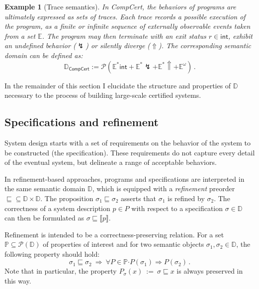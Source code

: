 \documentclass[11pt,oneside]{book}
\newtheorem{example}[theorem]{Example}
\theoremstyle{definition}
\newcommand{\kw}[1]{\ensuremath{ \mathsf{#1} }}
\newcommand{\bdot}{\boldsymbol{\cdot}}
\newcommand{\refby}{\sqsubseteq} %
\begin{document}
\begin{example}[Trace semantics] \label{ex:trsem} %
In CompCert,
the behaviors of programs are ultimately expressed
as sets of traces.
Each trace records a possible execution of the program,
as a finite or infinite sequence of externally observable events
taken from a set $\mathbb{E}$.
The program may then
terminate with an exit status $r \in \kw{int}$,
exhibit an undefined behavior ($\lightning$)
or silently diverge ($\Uparrow$).
The corresponding semantic domain can be defined as:
\[
  \mathbb{D}_\kw{CompCert} :=
    \mathcal{P}
      (\mathbb{E}^*\kw{int} +
       \mathbb{E}^*{\lightning} +
       \mathbb{E}^*{\Uparrow} +
       \mathbb{E}^\omega)
  \,.
\]
\end{example}

In the remainder of this section I elucidate
the structure and properties of $\mathbb{D}$
necessary to the process of building
large-scale certified systems.


\subsection{Specifications and refinement} %

System design starts with a set of requirements
on the behavior of the system to be constructed
(the specification).
These requirements do not capture every detail
of the eventual system,
but delineate a range of acceptable behaviors.

In refinement-based approaches,
programs and specifications are interpreted in the same
semantic domain $\mathbb{D}$,
which is equipped with a \emph{refinement} preorder
${\refby} \subseteq \mathbb{D} \times \mathbb{D}$.
The proposition $\sigma_1 \refby \sigma_2$
asserts that $\sigma_1$ is refined by $\sigma_2$.
The correctness of a system description $p \in P$
with respect to a specification $\sigma \in \mathbb{D}$
can then be formulated as
$\sigma \refby \llbracket p \rrbracket$.

Refinement is intended to be a correctness-preserving relation.
For a set
$\mathbb{P} \subseteq \mathcal{P}(\mathbb{D})$
of properties of interest
and for two semantic objects $\sigma_1, \sigma_2 \in \mathbb{D}$,
the following property should hold:
\[
  \sigma_1 \refby \sigma_2 \:\Rightarrow\:
  \forall P \in \mathbb{P} \bdot
    P(\sigma_1) \Rightarrow P(\sigma_2) \,.
\]
Note that in particular,
the property $P_\sigma(x) \: := \: \sigma \refby x$
is always preserved in this way.
\end{document}

